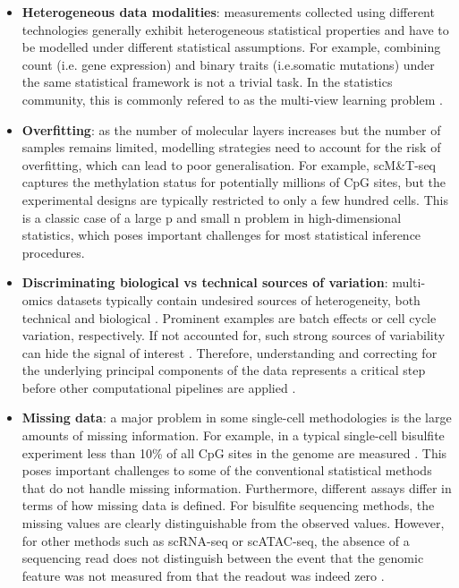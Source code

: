 \begin{itemize}
	\item \textbf{Heterogeneous data modalities}: measurements collected using different technologies generally exhibit heterogeneous statistical properties and have to be modelled under different statistical assumptions. For example, combining count (i.e. gene expression) and binary traits (i.e.somatic mutations) under the same statistical framework is not a trivial task. In the statistics community, this is commonly refered to as the multi-view learning problem \cite{Xu2013,Li2016}.

	\item \textbf{Overfitting}: as the number of molecular layers increases but the number of samples remains limited, modelling strategies need to account for the risk of overfitting, which can lead to poor generalisation. For example, scM\&T-seq captures the methylation status for potentially millions of CpG sites, but the experimental designs are typically restricted to only a few hundred cells. This is a classic case of a large p and small n problem in high-dimensional statistics, which poses important challenges for most statistical inference procedures.

	\item \textbf{Discriminating biological vs technical sources of variation}: multi-omics datasets typically contain undesired sources of heterogeneity, both technical and biological \cite{Ritchie2015}. Prominent examples are batch effects or cell cycle variation, respectively. If not accounted for, such strong sources of variability can hide the signal of interest \cite{Buettner2015}. Therefore, understanding and correcting for the underlying principal components of the data represents a critical step before other computational pipelines are applied \cite{Meng2016}.

	\item \textbf{Missing data}: a major problem in some single-cell methodologies is the large amounts of missing information. For example, in a typical single-cell bisulfite experiment less than 10\% of all CpG sites in the genome are measured \cite{Smallwood2014}. This poses important challenges to some of the conventional statistical methods that do not handle missing information. Furthermore, different assays differ in terms of how missing data is defined. For bisulfite sequencing methods, the missing values are clearly distinguishable from the observed values. However, for other methods such as scRNA-seq or scATAC-seq, the absence of a sequencing read does not distinguish between the event that the genomic feature was not measured from that the readout was indeed zero \cite{Clark2018}. %


\end{itemize}
